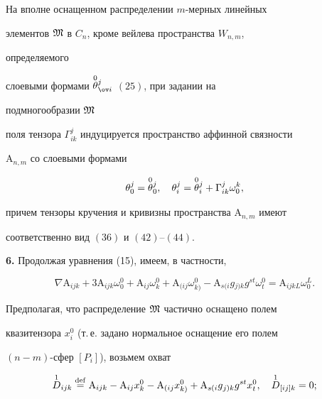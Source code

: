  


\begin{thm} 


На вполне оснащенном распределении $m$-мерных линейных 


элементов $\frak M$ в $C_n$, кроме вейлева пространства $W_{n,m}$, 


определяемого 


слоевыми формами $\up{0}{\theta}^j_{\ov i}$ $(25)$, при задании на 


подмногообразии $\frak M$ 


поля тензора $\Gamma^j_{i k}$ индуцируется пространство аффинной связности 


$\mathrm A_{n,m}$ со слоевыми формами 


\begin{equation} 


\theta^j_0=\up{0}{\theta}^j_0,\quad 


\theta^j_i=\up{0}{\theta}^j_i+\Gamma^j_{i k}\omega^k_0, 


\end{equation} 


причем тензоры кручения и кривизны пространства $\mathrm A_{n,m}$ имеют 


соответственно вид $(36)$ и $(42)$--$(44)$. 


\end{thm} 


 


{\bf 6.} Продолжая уравнения (15), имеем, в частности, 


\begin{equation} 


\nabla\mathrm A_{i j k}+3\mathrm A_{i j k}\omega^0_0+ 


\mathrm A_{i j}\omega^0_k+\mathrm A{}_{(i j}\omega{}^0_{k)}- 


\mathrm A{}_{s(i}g{}_{j)k}g^{s t}\omega^0_t= 


\mathrm A_{i j k L}\omega^L_0. 


\end{equation} 


 


Предполагая, что распределение $\frak M$ частично оснащено полем 


квазитензора $x^0_i$ (т.\,е. задано нормальное оснащение его полем 


$(n-m)$-сфер $[P_i]$), возьмем охват 


\begin{equation} 


\up{1}{D}_{i j k}\eqdef \mathrm A_{i j k}-\mathrm A_{i j} 


x^0_k-\mathrm A{}_{(i j}x{}^0_{k)}+\mathrm A{}_{s(i}g{}_{j)k} 


g^{s t}x^0_t,\quad \up{1}{D}_{[i j]k}=0; 


\end{equation} 


